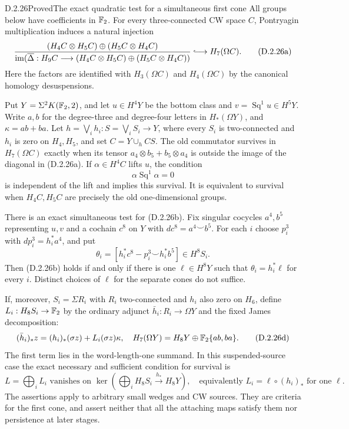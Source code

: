 \begin{claim}{D.2.26}{Proved}{The exact quadratic test for a simultaneous first cone}
All groups below have coefficients in $\mathbb F_2$.
For every three-connected CW space $C$, Pontryagin multiplication
induces a natural injection
\[
 \frac{(H_4C\otimes H_5C)\oplus(H_5C\otimes H_4C)}
 {\im(\overline\Delta:H_9C\longrightarrow
                (H_4C\otimes H_5C)\oplus(H_5C\otimes H_4C))}
 \lhook\joinrel\longrightarrow H_7(\Omega C).
 \tag{D.2.26a}
\]
Here the factors are identified with $H_3(\Omega C)$ and
$H_4(\Omega C)$ by the canonical homology desuspensions.

Put $Y=\Sigma^2K(\mathbb F_2,2)$, and let $u\in H^4Y$ be the
bottom class and $v=\operatorname{Sq}^1u\in H^5Y$.
Write $a,b$ for the degree-three and degree-four letters in
$H_*(\Omega Y)$, and $\kappa=ab+ba$.
Let $h=\bigvee_i h_i:S=\bigvee_i S_i\to Y$, where every $S_i$
is two-connected and $h_i$ is zero on $H_4,H_5$, and set
$C=Y\cup_h CS$. The old commutator survives in $H_7(\Omega C)$
exactly when its tensor $a_4\otimes b_5+b_5\otimes a_4$ is
outside the image of the diagonal in \textup{(D.2.26a)}.
If $\alpha\in H^4C$ lifts $u$, the condition
\[
 \alpha\operatorname{Sq}^1\alpha=0
 \tag{D.2.26b}
\]
is independent of the lift and implies this survival. It is
equivalent to survival when $H_4C,H_5C$ are precisely the old
one-dimensional groups.

There is an exact simultaneous test for \textup{(D.2.26b)}.
Fix singular cocycles $a^4,b^5$ representing $u,v$ and a cochain
$c^8$ on $Y$ with $dc^8=a^4\smile b^5$. For each $i$ choose
$p_i^3$ with $dp_i^3=h_i^*a^4$, and put
\[
 \theta_i=[h_i^*c^8-p_i^3\smile h_i^*b^5]\in H^8S_i.
 \tag{D.2.26c}
\]
Then \textup{(D.2.26b)} holds if and only if there is one
$\ell\in H^8Y$ such that $\theta_i=h_i^*\ell$ for every $i$.
Distinct choices of $\ell$ for the separate cones do not suffice.

If, moreover, $S_i=\Sigma R_i$ with $R_i$ two-connected and
$h_i$ also zero on $H_6$, define $L_i:H_8S_i\to\mathbb F_2$ by the
ordinary adjunct $\bar h_i:R_i\to\Omega Y$ and the fixed
James decomposition:
\[
 (\bar h_i)_*z=(h_i)_*(\sigma z)+L_i(\sigma z)\kappa,
 \quad
 H_7(\Omega Y)=H_8Y\oplus\mathbb F_2\{ab,ba\}.
 \tag{D.2.26d}
\]
The first term lies in the word-length-one summand. In this
suspended-source case the exact necessary and sufficient condition
for survival is
\[
 L=\bigoplus_iL_i\text{ vanishes on }
 \ker\!\left(\bigoplus_iH_8S_i\xrightarrow{h_*}H_8Y\right),
 \quad\text{equivalently }L_i=\ell\circ(h_i)_*\text{ for one }\ell.
 \tag{D.2.26e}
\]
The assertions apply to arbitrary small wedges and CW sources.
They are criteria for the first cone, and assert neither that
all the attaching maps satisfy them nor persistence at later stages.
\end{claim}
